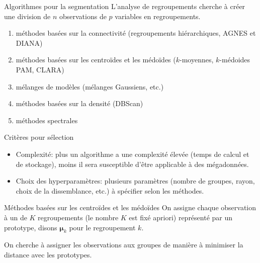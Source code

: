 \documentclass[
  ignorenonframetext,
]{beamer}
\providecommand{\tightlist}{%
  \setlength{\itemsep}{0pt}\setlength{\parskip}{0pt}}\usepackage{longtable,booktabs,array}
\begin{document}
\begin{frame}{Algorithmes pour la segmentation}
\protect\hypertarget{algorithmes-pour-la-segmentation}{}
L'analyse de regroupements cherche à créer une division de \(n\)
observations de \(p\) variables en regroupements.

\begin{enumerate}
\tightlist
\item
  méthodes basées sur la connectivité (regroupements hiérarchiques,
  AGNES et DIANA)
\item
  méthodes basées sur les centroïdes et les médoïdes (\(k\)-moyennes,
  \(k\)-médoides PAM, CLARA)
\item
  mélanges de modèles (mélanges Gaussiens, etc.)
\item
  méthodes basées sur la densité (DBScan)
\item
  méthodes spectrales
\end{enumerate}
\end{frame}

\begin{frame}{Critères pour sélection}
\protect\hypertarget{crituxe8res-pour-suxe9lection}{}
\begin{itemize}
\tightlist
\item
  Complexité: plus un algorithme a une complexité élevée (temps de
  calcul et de stockage), moins il sera susceptible d'être applicable à
  des mégadonnées.
\item
  Choix des hyperparamètres: plusieurs paramètres (nombre de groupes,
  rayon, choix de la dissemblance, etc.) à spécifier selon les méthodes.
\end{itemize}
\end{frame}

\begin{frame}{Méthodes basées sur les centroïdes et les médoïdes}
\protect\hypertarget{muxe9thodes-basuxe9es-sur-les-centrouxefdes-et-les-muxe9douxefdes}{}
On assigne chaque observation à un de \(K\) regroupements (le nombre
\(K\) est fixé apriori) représenté par un prototype, disons
\(\boldsymbol{\mu}_k\) pour le regroupement \(k\).

On cherche à assigner les observations aux groupes de manière à
minimiser la distance avec les prototypes.
\end{frame}
\end{document}
